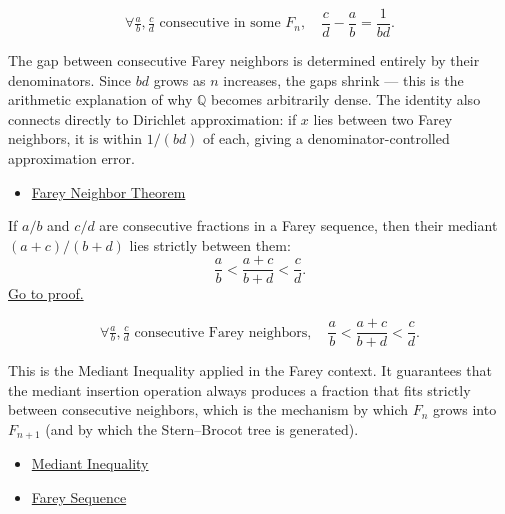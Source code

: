 \begin{remark*}
\[
\forall \tfrac{a}{b}, \tfrac{c}{d} \text{ consecutive in some } F_n,\quad
\frac{c}{d} - \frac{a}{b} = \frac{1}{bd}.
\]
\end{remark*}

\begin{remark*}[Interpretation]
The gap between consecutive Farey neighbors is determined entirely by
their denominators.  Since $bd$ grows as $n$ increases, the gaps shrink —
this is the arithmetic explanation of why $\mathbb{Q}$ becomes arbitrarily
dense.  The identity also connects directly to Dirichlet approximation:
if $x$ lies between two Farey neighbors, it is within $1/(bd)$ of each,
giving a denominator-controlled approximation error.
\end{remark*}

\begin{remark*}[Dependencies]
\begin{itemize}
  \item \hyperref[thm:farey-neighbor-theorem]{Farey Neighbor Theorem}
\end{itemize}
\end{remark*}

\begin{theorem}
\label{thm:farey-mediant-property}
If $a/b$ and $c/d$ are consecutive fractions in a Farey sequence, then
their mediant $(a+c)/(b+d)$ lies strictly between them:
\[
\frac{a}{b} < \frac{a+c}{b+d} < \frac{c}{d}.
\]
\hyperref[prf:farey-mediant-property]{Go to proof.}
\end{theorem}

\begin{remark*}
\[
\forall \tfrac{a}{b}, \tfrac{c}{d} \text{ consecutive Farey neighbors},\quad
\frac{a}{b} < \frac{a+c}{b+d} < \frac{c}{d}.
\]
\end{remark*}

\begin{remark*}[Interpretation]
This is the Mediant Inequality applied in the Farey context.  It guarantees
that the mediant insertion operation always produces a fraction that fits
strictly between consecutive neighbors, which is the mechanism by which
$F_n$ grows into $F_{n+1}$ (and by which the Stern--Brocot tree is generated).
\end{remark*}

\begin{remark*}[Dependencies]
\begin{itemize}
  \item \hyperref[thm:mediant-inequality]{Mediant Inequality}
  \item \hyperref[def:farey-sequence]{Farey Sequence}
\end{itemize}
\end{remark*}

